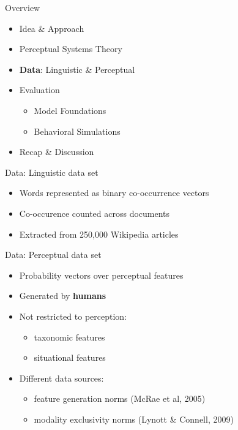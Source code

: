 \documentclass[12pt,a4paper]{beamer}
\begin{document}
\begin{frame}{Overview}
\begin{itemize}
\item Idea \& Approach
\item Perceptual Systems Theory
\item \textbf{Data}: Linguistic \& Perceptual
\item Evaluation
    \begin{itemize}
    \item Model Foundations
    \item Behavioral Simulations
    \end{itemize}
\item Recap \& Discussion
\end{itemize}
\end{frame}



\begin{frame}{Data: Linguistic data set}
\begin{itemize}
\item Words represented as binary co-occurrence vectors
\item Co-occurence counted across documents
\item Extracted from 250,000 Wikipedia articles
\end{itemize}
\end{frame}


\begin{frame}{Data: Perceptual data set}
\begin{itemize}
\item Probability vectors over perceptual features
\item Generated by \textbf{humans}
\item Not restricted to perception:
    \begin{itemize}
    \item taxonomic features
    \item situational features
    \end{itemize}
\item Different data sources:
    \begin{itemize}
    \item feature generation norms (McRae et al, 2005)
    \item modality exclusivity norms (Lynott \& Connell, 2009)
    \end{itemize}
\end{itemize}
\end{frame}
\end{document}
